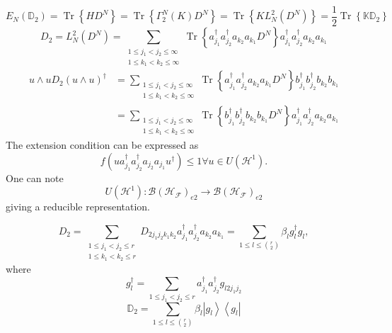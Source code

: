 \documentclass[aps,preprint]{revtex4}%
\begin{document}
\begin{equation}
E_{N}\left(  \mathbb{D}_{2}\right)  =\operatorname{Tr}\left\{  HD^{N}\right\}
=\operatorname{Tr}\left\{  \Gamma_{2}^{N}\left(  K\right)  D^{N}\right\}
=\operatorname{Tr}\left\{  KL_{N}^{2}\left(  D^{N}\right)  \right\}  =\frac
{1}{2}\operatorname{Tr}\left\{  \mathbb{KD}_{2}\right\}
\end{equation}%
\begin{equation}
D_{2}=L_{N}^{2}\left(  D^{N}\right)  =\sum_{\substack{1\leq j_{1}<j_{2}%
\leq\infty\\1\leq k_{1}<k_{2}\leq\infty}}\operatorname{Tr}\left\{  a_{j_{1}%
}^{\dagger}a_{j_{2}}^{\dagger}a_{k_{2}}a_{k_{1}}D^{N}\right\}  a_{j_{1}%
}^{\dagger}a_{j_{2}}^{\dagger}a_{k_{2}}a_{k_{1}}%
\end{equation}%
\begin{align}
u\wedge uD_{2}\left(  u\wedge u\right)  ^{\dagger}  &  =\sum_{\substack{1\leq
j_{1}<j_{2}\leq\infty\\1\leq k_{1}<k_{2}\leq\infty}}\operatorname{Tr}\left\{
a_{j_{1}}^{\dagger}a_{j_{2}}^{\dagger}a_{k_{2}}a_{k_{1}}D^{N}\right\}
b_{j_{1}}^{\dagger}b_{j_{2}}^{\dagger}b_{k_{2}}b_{k_{1}}\nonumber\\
&  =\sum_{\substack{1\leq j_{1}<j_{2}\leq\infty\\1\leq k_{1}<k_{2}\leq\infty
}}\operatorname{Tr}\left\{  b_{j_{1}}^{\dagger}b_{j_{2}}^{\dagger}b_{k_{2}%
}b_{k_{1}}D^{N}\right\}  a_{j_{1}}^{\dagger}a_{j_{2}}^{\dagger}a_{k_{2}%
}a_{k_{1}}%
\end{align}
The extension condition can be expressed as
\begin{equation}
f\left(  ua_{j_{1}}^{\dagger}a_{j_{2}}^{\dagger}a_{j_{2}}a_{j_{1}}u^{\dagger
}\right)  \leq1\forall u\in U\left(  \mathcal{H}^{1}\right)  .
\end{equation}
One can note
\begin{equation}
U\left(  \mathcal{H}^{1}\right)  :\mathcal{B}\left(  \mathcal{H}_{\mathcal{F}%
}\right)  _{e2}\rightarrow\mathcal{B}\left(  \mathcal{H}_{\mathcal{F}}\right)
_{e2}%
\end{equation}
giving a reducible representation.%

\begin{equation}
D_{2}=\sum_{\substack{1\leq j_{1}<j_{2}\leq r\\1\leq k_{1}<k_{2}\leq
r}}D_{2j_{1}j_{2}k_{1}k_{2}}a_{j_{1}}^{\dagger}a_{j_{2}}^{\dagger}a_{k_{2}%
}a_{k_{1}}=\sum_{1\leq l\leq\binom{r}{2}}\beta_{l}g_{l}^{\dagger}g_{l},
\end{equation}
where%
\begin{equation}
g_{l}^{\dagger}=\sum_{1\leq j_{1}<j_{2}\leq r}a_{j_{1}}^{\dagger}a_{j_{2}%
}^{\dagger}g_{l2j_{1}j_{2}}%
\end{equation}%
\begin{equation}
\mathbb{D}_{2}=\sum_{1\leq l\leq\binom{r}{2}}\beta_{l}\left\vert
g_{l}\right\rangle \left\langle g_{l}\right\vert
\end{equation}
\end{document}
